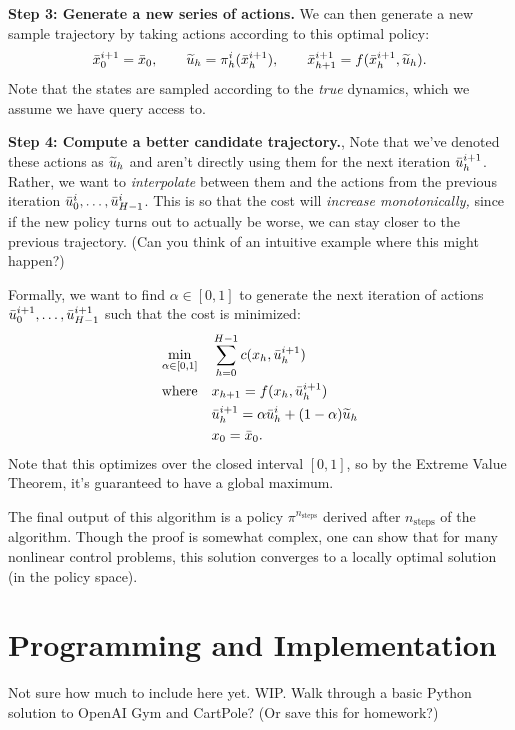 \documentclass[../main/main]{subfiles}
\begin{document}
\textbf{Step 3: Generate a new series of actions.}
We can then generate a new sample trajectory by taking actions according to this optimal policy: \[
    \bar {x}^{i+1}_0 = \bar {x}_0, \qquad \widetilde {u}_h = \pi^i_h(\bar {x}^{i+1}_h), \qquad \bar {x}^{i+1}_{h+1} = f(\bar {x}^{i+1}_h, \widetilde {u}_h).
\]
Note that the states are sampled according to the \emph{true} dynamics, which we assume we have query access to.

\textbf{Step 4: Compute a better candidate trajectory.},
Note that we've denoted these actions as $\widetilde {u}_h$ and aren't directly using them for the next iteration $\bar {u}^{i+1}_h$.
Rather, we want to \emph{interpolate} between them and the actions from the previous iteration $\bar {u}^i_0, \dots, \bar {u}^i_{H-1}$.
This is so that the cost will \emph{increase monotonically,} since if the new policy turns out to actually be worse, we can stay closer to the previous trajectory. (Can you think of an intuitive example where this might happen?)

Formally, we want to find $\alpha \in [0, 1]$ to generate the next iteration of actions $\bar {u}^{i+1}_0, \dots, \bar {u}^{i+1}_{H-1}$ such that the cost is minimized:
\begin{align*}
    \min_{\alpha \in [0, 1]} \quad & \sum_{h=0}^{H-1} c(x_h, \bar {u}^{i+1}_h) \\
    \text{where} \quad & x_{h+1} = f(x_h, \bar {u}^{i+1}_h) \\
    & \bar {u}^{i+1}_h = \alpha \bar {u}^i_h + (1-\alpha) \widetilde {u}_h \\
    & x_0 = \bar {x}_0.
\end{align*}
Note that this optimizes over the closed interval $[0, 1]$, so by the Extreme Value Theorem, it's guaranteed to have a global maximum.

The final output of this algorithm is a policy $\pi^{n_\text{steps}}$ derived after $n_\text{steps}$ of the algorithm.
Though the proof is somewhat complex, one can show that for many nonlinear control problems, this solution converges to a locally optimal solution (in the policy space).

\iffalse
\section{Programming and Implementation}

Not sure how much to include here yet. WIP. Walk through a basic Python solution
to OpenAI Gym and CartPole? (Or save this for homework?)
\end{document}
